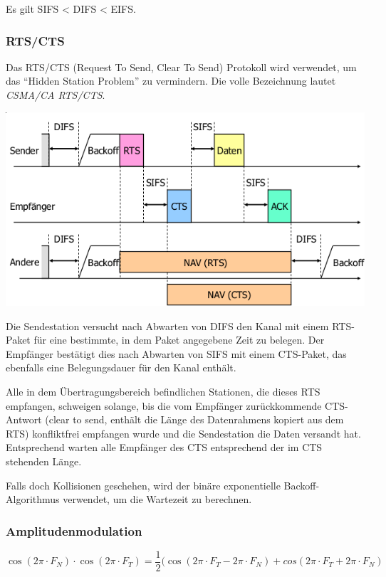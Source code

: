 Es gilt SIFS < DIFS < EIFS.


\subsubsection{RTS/CTS}

Das RTS/CTS (Request To Send, Clear To Send) Protokoll wird verwendet, um das
``Hidden Station Problem'' zu vermindern. Die volle Bezeichnung lautet
\textit{CSMA/CA RTS/CTS}.

\begin{center}
	\includegraphics[width=.8\textwidth]{media/rts_cts.png}
\end{center}

Die Sendestation versucht nach Abwarten von DIFS den Kanal mit einem RTS-Paket
für eine bestimmte, in dem Paket angegebene Zeit zu belegen. Der Empfänger
bestätigt dies nach Abwarten von SIFS mit einem CTS-Paket, das ebenfalls eine
Belegungsdauer für den Kanal enthält.

Alle in dem Übertragungsbereich befindlichen Stationen, die dieses RTS
empfangen, schweigen solange, bis die vom Empfänger zurückkommende CTS-Antwort
(clear to send, enthält die Länge des Datenrahmens kopiert aus dem RTS)
konfliktfrei empfangen wurde und die Sendestation die Daten versandt hat.
Entsprechend warten alle Empfänger des CTS entsprechend der im CTS stehenden
Länge.

Falls doch Kollisionen geschehen, wird der binäre exponentielle
Backoff-Algorithmus verwendet, um die Wartezeit zu berechnen.


\subsubsection{Amplitudenmodulation}

\[
	\cos (2\pi \cdot F_N) \cdot \cos (2\pi \cdot F_T)
	= \frac{1}{2}(\cos (2\pi \cdot F_T - 2\pi \cdot F_N)
	+ cos(2\pi \cdot F_T + 2\pi \cdot F_N)
\]

